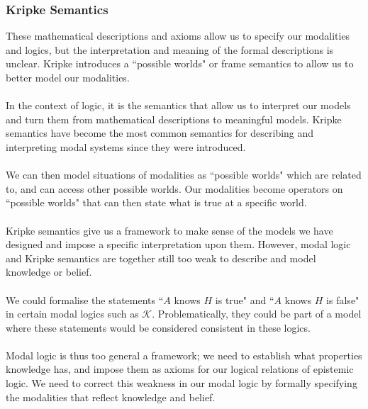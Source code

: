 \documentclass[12pt, a4paper, titlepage]{scrartcl}
\begin{document}
\subsubsection{Kripke Semantics}\label{epistemic_kripke}
These mathematical descriptions and axioms allow us to specify our modalities
and logics, but the interpretation and meaning of the formal descriptions is
unclear.
Kripke introduces a ``possible worlds" or frame semantics to allow us to better
model our modalities. \citep{blackburn2002modal} \\
\\
In the context of logic, it is the semantics that allow us to interpret our
models and turn them from mathematical descriptions to meaningful models.
Kripke semantics have become the most common semantics for describing and
interpreting modal systems since they were introduced.\\
\\
We can then model situations of modalities as ``possible worlds" which are
related to, and can access other possible worlds.
Our modalities become operators on ``possible worlds" that can then state what
is true at a specific world.\\
\\
Kripke semantics give us a framework to make sense of the models we have
designed and impose a specific interpretation upon them.
However, modal logic and Kripke semantics are together still too weak to
describe and model knowledge or belief.\\
\\
We could formalise the statements ``$A$ knows $H$ is true" and ``$A$ knows $H$
is false" in certain modal logics such as $\mathcal{K}$.
Problematically, they could be part of a model where these statements would be
considered consistent in these logics.\\
\\
Modal logic is thus too general a framework; we need to establish what
properties knowledge has, and impose them as axioms for our logical relations of
epistemic logic.
We need to correct this weakness in our modal logic by formally specifying the
modalities that reflect knowledge and belief.
\end{document}
